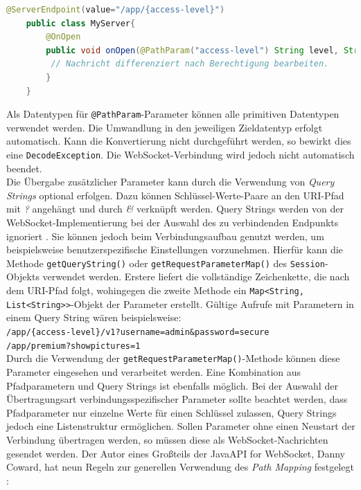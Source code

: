 \documentclass[11pt,a4paper,titlepage]{scrartcl}
\numberwithin{equation}{section}
\begin{document}
\begin{lstlisting}[frame=single, language=Java, caption=Java: PathParam]
	@ServerEndpoint(value="/app/{access-level}")
	public class MyServer{
		@OnOpen
		public void onOpen(@PathParam("access-level") String level, String msg) {
		 // Nachricht differenziert nach Berechtigung bearbeiten. 
		}
	}
\end{lstlisting}

\noindent Als Datentypen für \texttt{@PathParam}-Parameter können alle primitiven Datentypen verwendet werden. Die Umwandlung in den jeweiligen Zieldatentyp erfolgt automatisch. Kann die Konvertierung nicht durchgeführt werden, so bewirkt dies eine \texttt{DecodeException}. Die WebSocket-Verbindung wird jedoch nicht automatisch beendet.\\

\noindent Die Übergabe zusätzlicher Parameter kann durch die Verwendung von \textit{Query Strings} optional erfolgen. Dazu können Schlüssel-Werte-Paare an den URI-Pfad mit \textit{?} angehängt und durch \textit{\&} verknüpft werden. Query Strings werden von der WebSocket-Implementierung bei der Auswahl des zu verbindenden Endpunkts ignoriert \autocite[156]{coward_java_2014}. Sie können jedoch beim Verbindungsaufbau genutzt werden, um beispielsweise benutzerspezifische Einstellungen vorzunehmen. Hierfür kann die Methode \texttt{getQueryString()} oder \texttt{getRequestParameterMap()} des \texttt{Session}-Objekts verwendet werden. Erstere liefert die vollständige Zeichenkette, die nach dem URI-Pfad folgt, wohingegen die zweite Methode ein \texttt{Map<String, List<String>{}>}-Objekt der Parameter erstellt. Gültige Aufrufe mit Parametern in einem Query String wären beispielsweise:\\

\noindent\texttt{/app/\{access-level\}/v1?username=admin\&password=secure}\\
\noindent\texttt{/app/premium?showpictures=1}\\

\noindent Durch die Verwendung der \texttt{getRequestParameterMap()}-Methode können diese Parameter eingesehen und verarbeitet werden. Eine Kombination aus Pfadparametern und Query Strings ist ebenfalls möglich. Bei der Auswahl der Übertragungsart verbindungsspezifischer Parameter sollte beachtet werden, dass Pfadparameter nur einzelne Werte für einen Schlüssel zulassen, Query Strings jedoch eine Listenstruktur ermöglichen. Sollen Parameter ohne einen Neustart der Verbindung übertragen werden, so müssen diese als WebSocket-Nachrichten gesendet werden. Der Autor eines Großteils der Java\texttrademark API for WebSocket, Danny Coward, hat neun Regeln zur generellen Verwendung des \textit{Path Mapping} festgelegt \autocite[146-159]{coward_java_2014}:
\end{document}
